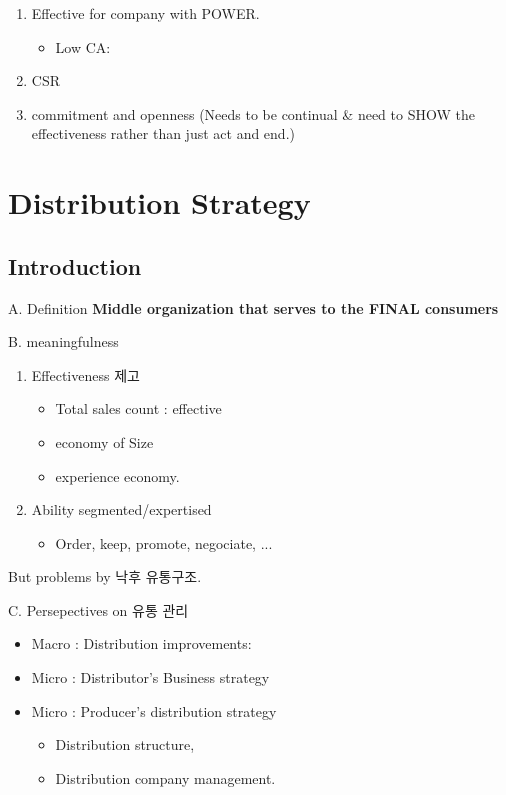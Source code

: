 \documentclass[12pt]{article}
\newcommand{\tb}{\textbf}
\begin{document}
\begin{itemize}
\begin{enumerate}
	\item Effective for company with POWER.
	\begin{itemize}
		\item Low CA:
	\end{itemize}

	\item CSR

	\item commitment and openness (Needs to be continual \& need to SHOW the effectiveness rather than just act and end.)
\end{enumerate}

\section{Distribution Strategy}

\subsection{Introduction}
A. Definition
\tb{Middle organization that serves to the FINAL consumers}

B. meaningfulness

\begin{enumerate}
	\item Effectiveness 제고
	\begin{itemize}
		\item Total sales count : effective
		\item economy of Size
		\item experience economy.
	\end{itemize}
	\item Ability segmented/expertised
	\begin{itemize}
		\item Order, keep, promote, negociate, ...
	\end{itemize}
\end{enumerate}

But problems by 낙후 유통구조.

C. Persepectives on 유통 관리

\begin{itemize}
	\item Macro : Distribution improvements:
	\item Micro : Distributor's Business strategy
	\item Micro : Producer's distribution strategy
	\begin{itemize}
		\item Distribution structure,
		\item Distribution company management.
	\end{itemize}
\end{itemize}


\end{itemize}
\end{document}
